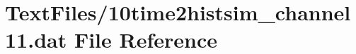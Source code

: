 \hypertarget{10time2histsim__channel11_8dat}{}\section{Text\+Files/10time2histsim\+\_\+channel11.dat File Reference}
\label{10time2histsim__channel11_8dat}
